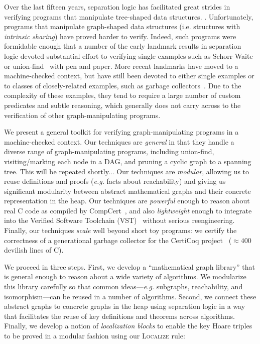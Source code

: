 Over the last fifteen years, separation logic has facilitated great strides 
in verifying programs that manipulate tree-shaped data structures. \cite{berdine:smallfoot,chin:hipsleek,jacobs:verifast,chlipala:bedrock,bengtson:charge,appel:programlogics}. 
Unfortunately, programs that manipulate graph-shaped data structures 
(i.e. structures with \emph{intrinsic sharing}) have proved harder to verify.  
Indeed, such programs were formidable enough that a number of the early 
landmark results in separation logic devoted substantial effort to verifying 
single examples such as Schorr-Waite~\cite{hongseok:phd} or 
union-find~\cite{NeelThesis} with pen and paper.  
More recent landmarks have moved to a machine-checked context, but have still
been devoted to either single examples or to classes of closely-related examples, 
such as garbage collectors~\cite{A,CakeMLGC,C}.
Due to the complexity of these examples, they tend to require a large number 
of custom predicates and subtle reasoning, which generally does not carry across 
to the verification of other graph-manipulating programs.

We present a general toolkit for verifying graph-manipulating programs in a 
machine-checked context. Our techniques are \emph{general} in that they handle a diverse 
range of graph-manipulating programs, {\color{blue}including union-find, visiting/marking 
each node in a DAG, and pruning a cyclic graph to a spanning tree.} {\color{magenta}This 
will be repeated shortly...}
Our techniques are \emph{modular}, allowing us to reuse definitions and proofs 
(\emph{e.g.} facts about reachability) and giving us {\color{magenta} significant 
modularity} between abstract mathematical graphs and their concrete representation 
in the heap.
Our techniques are \emph{powerful} enough to reason about real C code as compiled by 
CompCert~\cite{blah}, and also \emph{lightweight} enough to integrate into the Verified 
Software Toolchain (VST)~\cite{appel:programlogics} without serious reengineering.
Finally, our techniques \emph{scale} well beyond short toy programs: we certify the 
correctness of a generational garbage collector for the CertiCoq project~\cite{blah} 
($\approx400$ devilish lines of C).

We proceed in three steps. First, we develop a ``mathematical graph library'' that is general enough to reason about a wide variety of algorithms.  We modularize this library carefully so that common ideas---\emph{e.g.} subgraphs, reachability, and isomorphism---can be reused in a number of algorithms.  
Second, we connect these abstract graphs to
concrete graphs in the heap using separation logic in a way that facilitates the reuse of key definitions and theorems across algorithms.  Finally, we develop a notion of \emph{localization blocks} to
enable the key Hoare triples to be proved in a modular fashion using our \textsc{Localize}
rule:

